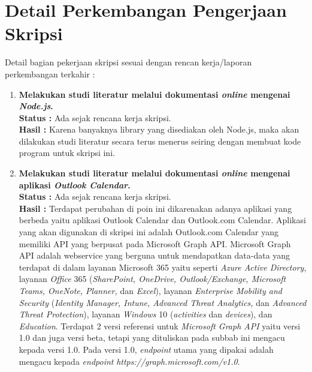 \documentclass[a4paper,twoside]{article}
\begin{document}
\section{Detail Perkembangan Pengerjaan Skripsi}
Detail bagian pekerjaan skripsi sesuai dengan rencan kerja/laporan perkembangan terkahir :
	\begin{enumerate}
		\item \textbf{Melakukan studi literatur melalui dokumentasi \textit{online} mengenai \textit{Node.js}.}\\
		{\bf Status :} Ada sejak rencana kerja skripsi.\\
		{\bf Hasil :} Karena banyaknya library yang disediakan oleh Node.js, maka akan dilakukan studi literatur secara terus menerus seiring dengan membuat kode program untuk skripsi ini. 
		
		\item \textbf{Melakukan studi literatur melalui dokumentasi \textit{online} mengenai aplikasi \textit{Outlook Calendar}.}\\
		{\bf Status :} Ada sejak rencana kerja skripsi.\\
		{\bf Hasil :} Terdapat perubahan di poin ini dikarenakan adanya aplikasi yang berbeda yaitu aplikasi Outlook Calendar dan Outlook.com Calendar. Aplikasi yang akan digunakan di skripsi ini adalah Outlook.com Calendar yang memiliki API yang berpusat pada Microsoft Graph API. Microsoft Graph API adalah webservice yang berguna untuk mendapatkan data-data yang terdapat di dalam layanan Microsoft 365 yaitu seperti \textit{Azure Active Directory}, layanan \textit{Office} 365 (\textit{SharePoint, OneDrive, Outlook/Exchange, Microsoft Teams, OneNote, Planner,} dan \textit{Excel}), layanan \textit{Enterprise Mobility and Security} (\textit{Identity Manager, Intune, Advanced Threat Analytics,} dan \textit{Advanced Threat Protection}), layanan \textit{Windows} 10 (\textit{activities} dan \textit{devices}), dan \textit{Education}. Terdapat 2 versi referensi untuk \textit{Microsoft Graph API} yaitu versi 1.0 dan juga versi beta, tetapi yang dituliskan pada subbab ini mengacu kepada versi 1.0. Pada versi 1.0, \textit{endpoint} utama yang dipakai adalah mengacu kepada \textit{endpoint} \textit{https://graph.microsoft.com/v1.0}. 
		

\end{enumerate}
\end{document}
